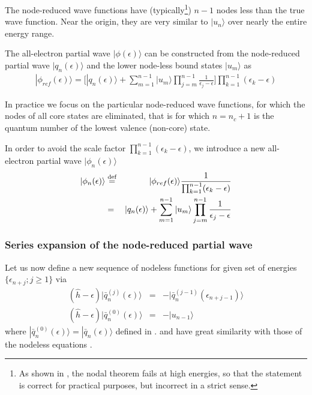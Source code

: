 \documentclass[11pt,a4paper]{report}
\begin{document}
The node-reduced wave functions have (typically\footnote{As shown in
  \cite{bloechl12_arxiv1210_5937}, the nodal theorem fails at high
  energies, so that the statement is correct for practical purposes,
  but incorrect in a strict sense.}) $n-1$ nodes less than the true
wave function. Near the origin, they are very similar to $|u_n\rangle$
over nearly the entire energy range.

The all-electron partial wave $|\phi(\epsilon)\rangle$ can be
constructed from the node-reduced partial wave $|q_n(\epsilon)\rangle$
and the lower node-less bound states $|u_m\rangle$
as\cite{bloechl12_arxiv1210_5937}
\begin{eqnarray}
|\phi_{ref}(\epsilon)\rangle=\biggl[|q_n(\epsilon)\rangle
+\sum_{m=1}^{n-1}|u_m\rangle\prod_{j=m}^{n-1}\frac{1}{\epsilon_j-\epsilon}
\biggr]
\prod_{k=1}^{n-1}(\epsilon_k-\epsilon)
\label{eq:aephireffromnodereduced}
\end{eqnarray}

In practice we focus on the particular node-reduced wave functions,
for which the nodes of all core states are eliminated, that is for
which $n=n_c+1$ is the quantum number of the lowest valence (non-core)
state.

In order to avoid the scale factor
$\prod_{k=1}^{n-1}(\epsilon_k-\epsilon)$, we introduce a new
all-electron partial wave $|\phi_n(\epsilon)\rangle$
\begin{eqnarray}
|\phi_n(\epsilon)\rangle&\stackrel{\text{def}}{=}&
|\phi_{ref}(\epsilon)\rangle\frac{1}{\prod_{k=1}^{n-1}(\epsilon_k-\epsilon)}
\nonumber\\
&=&|q_n(\epsilon)\rangle
+\sum_{m=1}^{n-1}|u_m\rangle\prod_{j=m}^{n-1}\frac{1}{\epsilon_j-\epsilon}
\label{eq:aephifromnodereduced}
\end{eqnarray}

\subsubsection{Series expansion of the node-reduced partial wave}
Let us now define \cite{bloechl12_arxiv1210_5937} a new sequence of
nodeless functions for given set of energies $\{\epsilon_{n+j}; j\ge1\}$ via
\begin{eqnarray}
(\hat{h}-\epsilon)|\bar{q}_{n}^{(j)}(\epsilon)\rangle&=&
-|\bar{q}_n^{(j-1)}(\epsilon_{n+j-1})\rangle
\label{eq:qbardiffgl}
\\
(\hat{h}-\epsilon)|\bar{q}_{n}^{(0)}(\epsilon)\rangle&=&-|u_{n-1}\rangle 
\label{eq:qbardiffgl0}
\end{eqnarray}
where
$|\bar{q}_{n}^{(0)}(\epsilon)\rangle=|\bar{q}_{n}(\epsilon)\rangle$
defined in .  and
 have great similarity with those of
the nodeless equations .
\end{document}
